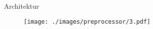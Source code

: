 \begin{frame}{Architektur}
    \begin{figure}
    	\centering
    	\texttt{[image: ./images/preprocessor/3.pdf]}
    \end{figure}
\end{frame}
